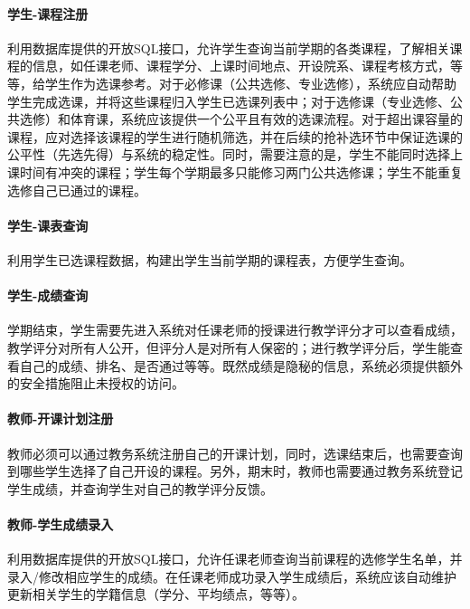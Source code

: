 \paragraph{学生-课程注册}

利用数据库提供的开放SQL接口，允许学生查询当前学期的各类课程，了解相关课程的信息，如任课老师、课程学分、上课时间地点、开设院系、课程考核方式，等等，给学生作为选课参考。对于必修课（公共选修、专业选修），系统应自动帮助学生完成选课，并将这些课程归入学生已选课列表中；对于选修课（专业选修、公共选修）和体育课，系统应该提供一个公平且有效的选课流程。对于超出课容量的课程，应对选择该课程的学生进行随机筛选，并在后续的抢补选环节中保证选课的公平性（先选先得）与系统的稳定性。同时，需要注意的是，学生不能同时选择上课时间有冲突的课程；学生每个学期最多只能修习两门公共选修课；学生不能重复选修自己已通过的课程。

\paragraph{学生-课表查询}
  
利用学生已选课程数据，构建出学生当前学期的课程表，方便学生查询。

\paragraph{学生-成绩查询}
  
学期结束，学生需要先进入系统对任课老师的授课进行教学评分才可以查看成绩，教学评分对所有人公开，但评分人是对所有人保密的；进行教学评分后，学生能查看自己的成绩、排名、是否通过等等。既然成绩是隐秘的信息，系统必须提供额外的安全措施阻止未授权的访问。

\paragraph{教师-开课计划注册}
  
教师必须可以通过教务系统注册自己的开课计划，同时，选课结束后，也需要查询到哪些学生选择了自己开设的课程。另外，期末时，教师也需要通过教务系统登记学生成绩，并查询学生对自己的教学评分反馈。
  
\paragraph{教师-学生成绩录入}
  
利用数据库提供的开放SQL接口，允许任课老师查询当前课程的选修学生名单，并录入/修改相应学生的成绩。在任课老师成功录入学生成绩后，系统应该自动维护更新相关学生的学籍信息（学分、平均绩点，等等）。

